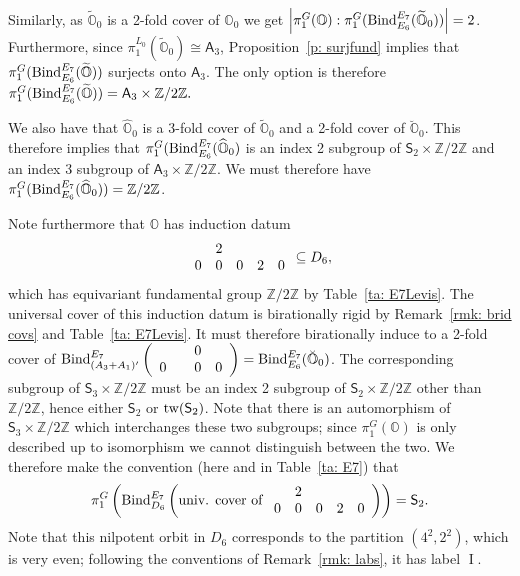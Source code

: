 \documentclass[11pt]{amsart}
\renewcommand{\O}{{\mathbb O}}
\newcommand{\bZ}{{\mathbb Z}}
\newcommand{\I}{{\mathfrak I}}
\newcommand{\II}{{\operatorname{II}}}
\renewcommand{\I}{{\operatorname{I}}}
\newcommand{\Alt}{{\mathsf{A}}}
\newcommand{\Sym}{{\mathsf{S}}}
\newcommand{\tw}{{{\mbox{\rm tw}}}}
\newcommand{\BInd}{{{\mbox{\rm Bind}}}}
\newcommand{\covO}{\widetilde{\O}}
\newcommand{\hatO}{\widehat{\O}}
\newcommand{\breveO}{\breve{\O}}
\numberwithin{equation}{section}
\begin{document}
	Similarly, as $\covO_0$ is a 2-fold cover of $\O_0$ we get  $\left\vert\pi_1^G(\O): \pi_1^G(\BInd_{E_6}^{E_7}(\covO_0)) \right\vert=2$. Furthermore, since $\pi_1^{L_0}(\covO_0)\cong\Alt_3$, Proposition~\ref{p: surjfund} implies that $\pi_1^G(\BInd_{E_6}^{E_7}(\covO))$ surjects onto $\Alt_3$. The only option is therefore $\pi_1^G(\BInd_{E_6}^{E_7}(\covO))=\Alt_3\times \bZ/2\bZ.$
	
	We also have that $\hatO_0$ is a 3-fold cover of $\covO_0$ and a 2-fold cover of $\breveO_0$. This therefore implies that $\pi_1^G(\BInd_{E_6}^{E_7}(\hatO_0)$ is an index 2 subgroup of $\Sym_2\times\bZ/2\bZ$ and an index 3 subgroup of $\Alt_3\times\bZ/2\bZ$. We must therefore have $\pi_1^G(\BInd_{E_6}^{E_7}(\hatO_0))=\bZ/2\bZ$. 
	
	Note furthermore that $\O$ has induction datum $$\begin{array}{c c c c c}
		& 2 & & &\\
		0  & 0 & 0 & 2 & 0
	\end{array}\subseteq D_6,$$ which has equivariant fundamental group $\bZ/2\bZ$ by Table~\ref{ta: E7Levis}. The universal cover of this induction datum is birationally rigid by Remark~\ref{rmk: brid covs} and Table~\ref{ta: E7Levis}. It must therefore birationally induce to a 2-fold cover of $\BInd_{(A_3+A_1)'}^{E_7}\left(\begin{array}{c c c c}
		& & 0 & \\
		0 &  & 0 & 0
	\end{array}\right)=\BInd_{E_6}^{E_7}(\breveO_0)$. The corresponding subgroup of $\Sym_3\times \bZ/2\bZ$ must be an index 2 subgroup of $\Sym_2\times\bZ/2\bZ$ other than $\bZ/2\bZ$, hence either $\Sym_2$ or $\tw(\Sym_2)$. Note that there is an automorphism of $\Sym_3\times \bZ/2\bZ$ which interchanges these two subgroups; since $\pi_1^G(\O)$ is only described up to isomorphism we cannot distinguish between the two. We therefore make the convention (here and in Table~\ref{ta: E7}) that $$\pi_1^G\left(\BInd_{D_6}^{E_7}\left(\mbox{univ. cover of }\begin{array}{c c c c c}
		& 2 & & &\\
		0  & 0 & 0 & 2 & 0
	\end{array}\right)\right)=\Sym_2.$$ Note that this nilpotent orbit in $D_6$ corresponds to the partition $(4^2,2^2)$, which is very even; following the conventions of Remark~\ref{rmk: labs}, it has label $\I$.
	
	
\end{document}
